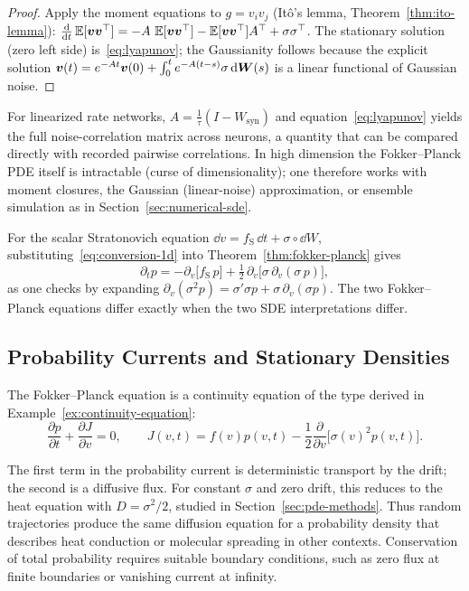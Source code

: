 \begin{proof}
Apply the moment equations to $g=v_iv_j$ (It\^o's lemma, Theorem~\ref{thm:ito-lemma}): $\frac{\mathrm{d}}{\mathrm{d} t}\operatorname{\mathbb{E}}[\bm{v}\bm{v}^\top]=-A\,\operatorname{\mathbb{E}}[\bm{v}\bm{v}^\top]-\operatorname{\mathbb{E}}[\bm{v}\bm{v}^\top]A^\top+\sigma\sigma^\top$. The stationary solution (zero left side) is~\eqref{eq:lyapunov}; the Gaussianity follows because the explicit solution $\bm{v}(t)=e^{-At}\bm{v}(0)+\int_0^te^{-A(t-s)}\sigma\,\mathrm{d}\bm{W}(s)$ is a linear functional of Gaussian noise.
\end{proof}

\noindent For linearized rate networks, $A=\tfrac{1}{\tau}(I-W_{\mathrm{syn}})$ and equation~\eqref{eq:lyapunov} yields the full noise-correlation matrix across neurons, a quantity that can be compared directly with recorded pairwise correlations. In high dimension the Fokker--Planck PDE itself is intractable (curse of dimensionality); one therefore works with moment closures, the Gaussian (linear-noise) approximation, or ensemble simulation as in Section~\ref{sec:numerical-sde}.

\begin{remark}
\label{rem:fp-stratonovich}
For the scalar Stratonovich equation $\dd v=f_{\mathrm S}\,\dd t+\sigma\circ\dd W$, substituting~\eqref{eq:conversion-1d} into Theorem~\ref{thm:fokker-planck} gives
\[
\partial_tp=-\partial_v\big[f_{\mathrm S}\,p\big]+\tfrac12\,\partial_v\!\big[\sigma\,\partial_v(\sigma\,p)\big],
\]
as one checks by expanding $\partial_v(\sigma^2p)=\sigma'\sigma p+\sigma\,\partial_v(\sigma p)$. The two Fokker--Planck equations differ exactly when the two SDE interpretations differ.
\end{remark}

\subsection{Probability Currents and Stationary Densities}

\begin{remark}
The Fokker--Planck equation is a continuity equation of the type derived in Example~\ref{ex:continuity-equation}:
\begin{equation}
\frac{\partial p}{\partial t}+\frac{\partial J}{\partial v}=0,
\qquad J(v,t)=f(v)p(v,t)-\frac12\frac{\partial}{\partial v}\big[\sigma(v)^2p(v,t)\big].
\end{equation}

The first term in the probability current is deterministic transport by the drift; the second is a diffusive flux. For constant $\sigma$ and zero drift, this reduces to the heat equation with $D=\sigma^2/2$, studied in Section~\ref{sec:pde-methods}. Thus random trajectories produce the same diffusion equation for a probability density that describes heat conduction or molecular spreading in other contexts. Conservation of total probability requires suitable boundary conditions, such as zero flux at finite boundaries or vanishing current at infinity.
\end{remark}

